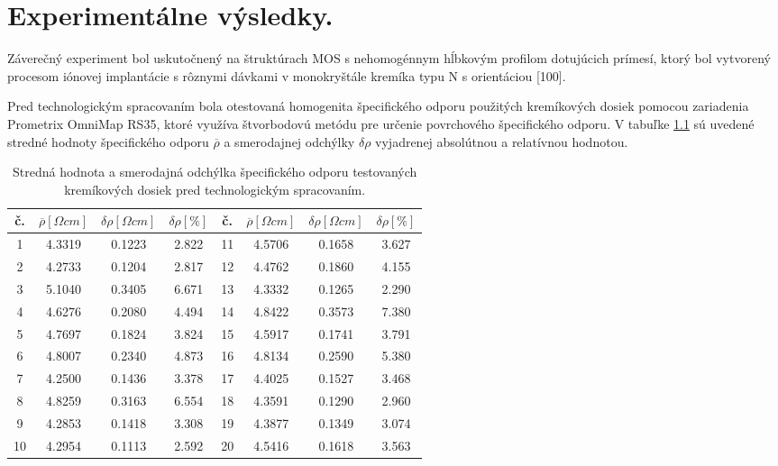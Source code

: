 \chapter{Experimentálne výsledky.}
\label{Chapter7}

Záverečný experiment bol uskutočnený na štruktúrach MOS s nehomogénnym
hĺbkovým profilom dotujúcich prímesí, ktorý bol vytvorený procesom
iónovej implantácie s rôznymi dávkami v monokryštále kremíka typu N s
orientáciou [100].

Pred technologickým spracovaním bola otestovaná homogenita
špecifického odporu použitých kremíkových dosiek pomocou zariadenia
Prometrix OmniMap RS35, ktoré využíva štvorbodovú metódu pre určenie
povrchového špecifického odporu. V tabuľke \ref{tab:7.1} sú uvedené
stredné hodnoty špecifického odporu $\overline\rho$ a smerodajnej
odchýlky $\delta\rho$ vyjadrenej absolútnou a relatívnou hodnotou.

\begin{table}[h!]\centering
\begin{tabular}{|c|c|c|c||c|c|c|c|}
\hline
č. & $\overline\rho[\Omega cm]$ & $\delta\rho[\Omega cm]$ & $\delta\rho[\%]$ &
č. & $\overline\rho[\Omega cm]$ & $\delta\rho[\Omega cm]$ & $\delta\rho[\%]$ \\
\hline
1  & 4.3319 & 0.1223 & 2.822 & 11 & 4.5706 & 0.1658 & 3.627 \\
2  & 4.2733 & 0.1204 & 2.817 & 12 & 4.4762 & 0.1860 & 4.155 \\
3  & 5.1040 & 0.3405 & 6.671 & 13 & 4.3332 & 0.1265 & 2.290 \\
4  & 4.6276 & 0.2080 & 4.494 & 14 & 4.8422 & 0.3573 & 7.380 \\
5  & 4.7697 & 0.1824 & 3.824 & 15 & 4.5917 & 0.1741 & 3.791 \\
6  & 4.8007 & 0.2340 & 4.873 & 16 & 4.8134 & 0.2590 & 5.380 \\
7  & 4.2500 & 0.1436 & 3.378 & 17 & 4.4025 & 0.1527 & 3.468 \\
8  & 4.8259 & 0.3163 & 6.554 & 18 & 4.3591 & 0.1290 & 2.960 \\
9  & 4.2853 & 0.1418 & 3.308 & 19 & 4.3877 & 0.1349 & 3.074 \\
10 & 4.2954 & 0.1113 & 2.592 & 20 & 4.5416 & 0.1618 & 3.563 \\
\hline
\end{tabular}
\captionsetup{justification=raggedright, singlelinecheck=false}
{\caption[Stredná hodnota a smerodajná odchýlka špecifického odporu
    testovaných kremíkových dosiek pred technologickým spracovaním]
  {Stredná hodnota a smerodajná odchýlka špecifického odporu
    testovaných kremíkových dosiek pred technologickým
    spracovaním.}\label{tab:7.1}}
\end{table}

